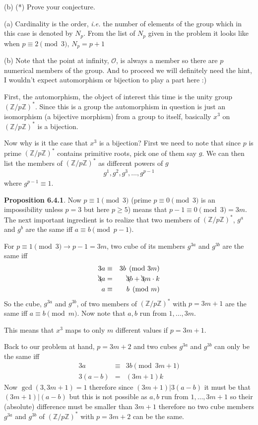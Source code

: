 \documentclass[aps,preprint,preprintnumbers,nofootinbib,showpacs,prd]{revtex4-1}
\newcommand{\ie}{{\it i.e.} }
\newcommand{\nbea}{\begin{eqnarray*}}
\newcommand{\neea}{\end{eqnarray*}}
\begin{document}
(b) (*) Prove your conjecture.

(a) Cardinality is the order, \ie the number of elements of the group which in this case is denoted by $N_p$. From the list of $N_p$ given in the problem it looks like when $p \equiv 2 \pmod{3}$, $N_p = p+1$

(b) Note that the point at infinity, $\mathcal{O}$, is always a member so there are $p$ numerical members of the group. And to proceed we will definitely need the hint, I wouldn't expect automorphism or bijection to play a part here :)

First, the automorphism, the object of interest this time is the unity group $(\mathbb{Z}/p\mathbb{Z})^*$. Since this is a group the automorphism in question is just an isomorphism (a bijective morphism) from a group to itself, basically $x^3$ on $(\mathbb{Z}/p\mathbb{Z})^*$ is a bijection.

Now why is it the case that $x^3$ is a bijection? First we need to note that since $p$ is prime $(\mathbb{Z}/p\mathbb{Z})^*$ contains primitive roots, pick one of them say $g$. We can then list the members of $(\mathbb{Z}/p\mathbb{Z})^*$ as different powers of $g$
%
\nbea
g^1, g^2, g^3, \dots, g^{p-1}
\neea
%
where $g^{p-1} \equiv 1$.

{\bf Proposition 6.4.1}. Now $p \equiv 1 \pmod{3}$ (prime $p \equiv 0 \pmod{3}$ is an impossibility unless $p = 3$ but here $p \ge 5$) means that $p-1 \equiv 0 \pmod{3} = 3m$. The next important ingredient is to realize that two members of $(\mathbb{Z}/p\mathbb{Z})^*$, $g^a$ and $g^b$ are the same iff $a \equiv b \pmod{p-1}$.

For $p \equiv 1 \pmod{3} \to p-1 = 3m$, two cube of its members $g^{3a}$ and $g^{3b}$ are the same iff
%
\nbea
3a & \equiv & 3b \pmod{3m} \\
\bcancel{3}a & = & \bcancel{3}b + \bcancel{3}m\cdot k \\
a & \equiv & b \pmod{m}
\neea
%
So the cube, $g^{3a}$ and $g^{3b}$, of two members of $(\mathbb{Z}/p\mathbb{Z})^*$ with $p = 3m + 1$ are the same iff $a \equiv b \pmod{m}$. Now note that $a,b$ run from $1,\dots, 3m$.

This means that $x^3$ maps to only $m$ different values if $p = 3m+1$.

Back to our problem at hand, $p = 3m + 2$ and two cubes $g^{3a}$ and $g^{3b}$ can only be the same iff
%
\nbea
3a & \equiv & 3b \pmod{3m + 1} \\
3 (a - b) & = & (3m+1)k
\neea
%
Now $\gcd(3,3m+1) = 1$ therefore since $(3m+1)|3(a-b)$ it must be that $(3m+1)|(a-b)$ but this is not possible as $a,b$ run from $1, \dots, 3m+1$ so their (absolute) difference must be smaller than $3m+1$ therefore no two cube members $g^{3a}$ and $g^{3b}$ of $(\mathbb{Z}/p\mathbb{Z})^*$ with $p = 3m + 2$ can be the same.
\end{document}
